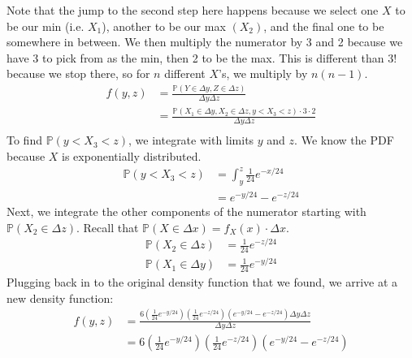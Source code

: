 \documentclass[titlepage, 12pt, leqno]{article}
\begin{document}
\begin{ex}
\begin{enumerate}
            Note that the jump to the second step here happens because we select
            one $X$ to be our min (i.e. $X_1$), another to be our max $(X_2)$, 
            and the final one to be somewhere in between. We then multiply the
            numerator by 3 and 2 because we have 3 to pick from as the min, then
            2 to be the max. This is different than $3!$ because we stop there, so
            for $n$ different $X$'s, we multiply by $n(n-1)$.
           \begin{align*}
               f(y,z) &= \frac{\mathbb{P}(Y \in \Delta y, Z \in \Delta z)}{
               \Delta y \Delta z} \\
                      &= \frac{\mathbb{P}(X_1 \in \Delta y, X_2 \in \Delta z
                      , y < X_3 < z) \cdot 3 \cdot 2}{\Delta y \Delta z} \\
           \end{align*}
            To find $\mathbb{P}(y<X_3<z)$, we integrate with limits $y$ and $z$.
            We know the PDF because $X$ is exponentially distributed.
            \begin{align*}
                \mathbb{P}(y<X_3<z) &= \int_{y}^{z}\frac{1}{24} e^{-x/24} \\
                                    &= e^{-y/24}-e^{-z/24}
            \end{align*}
            Next, we integrate the other components of the numerator starting with
            $\mathbb{P}(X_2 \in \Delta z)$. Recall that $\mathbb{P}(X \in \Delta
            x) = f_X(x)\cdot \Delta x$.
            \begin{align*}
                \mathbb{P}(X_2 \in \Delta z) &= \frac{1}{24}e^{-z/24} \\
                \mathbb{P}(X_1 \in \Delta y) &= \frac{1}{24}e^{-y/24}
            \end{align*}
            Plugging back in to the original density function that we found, we
            arrive at a new density function:
            \begin{align*}
                f(y,z) &= \frac{
                6\left(\frac{1}{24}e^{-y/24}\right)
                \left(\frac{1}{24}e^{-z/24}\right)\left(e^{-y/24}-
                e^{-z/24}\right) \Delta y \Delta z}{\Delta y \Delta z} \\
                &= 6\left(\frac{1}{24}e^{-y/24}\right)
                \left(\frac{1}{24}e^{-z/24}\right)\left(e^{-y/24}-
                e^{-z/24}\right)
            \end{align*}
            

\end{enumerate}
\end{ex}
\end{document}
